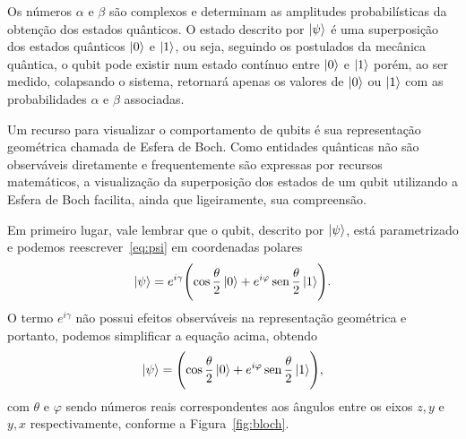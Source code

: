Os números $\alpha$ e $\beta$ são complexos e determinam as amplitudes probabilísticas da obtenção dos estados quânticos. O estado descrito por $\ket{\psi}$ é uma superposição dos estados quânticos $\ket{0}$ e $\ket{1}$, ou seja, seguindo os postulados da mecânica quântica, o qubit pode existir num estado contínuo entre $\ket{0}$ e $\ket{1}$ porém, ao ser medido, colapsando o sistema, retornará apenas os valores de $\ket{0}$ ou $\ket{1}$ com as probabilidades $\alpha$ e $\beta$ associadas.

Um recurso para visualizar o comportamento de qubits é sua representação geométrica chamada de Esfera de Boch. Como entidades quânticas não são observáveis diretamente e frequentemente são expressas por recursos matemáticos, a visualização da superposição dos estados de um qubit utilizando a Esfera de Boch facilita, ainda que ligeiramente, sua compreensão.

Em primeiro lugar, vale lembrar que o qubit, descrito por $\ket{\psi}$, está parametrizado e podemos reescrever~\eqref{eq:psi} em coordenadas polares
\begin{equation}
\ket{\psi}=e^{i \gamma}\Biggl(\cos \frac{\theta}{2}\ket{0}+e^{i \varphi} \operatorname{sen} \frac{\theta}{2}\ket{1}\Biggr).
\end{equation}
O termo \(e^{i\gamma}\) não possui efeitos observáveis na representação geométrica e portanto, podemos simplificar a equação acima, obtendo
\begin{equation}\label{eq:coordpolarpsi}
\ket{\psi}=\Biggl(\cos \frac{\theta}{2}\ket{0}+e^{i \varphi} \operatorname{sen} \frac{\theta}{2}\ket{1}\Biggr),
\end{equation}
com $\theta$ e $\varphi$ sendo números reais correspondentes aos ângulos entre os eixos $z, y$ e $y, x$ respectivamente, conforme a
Figura~\ref{fig:bloch}.

